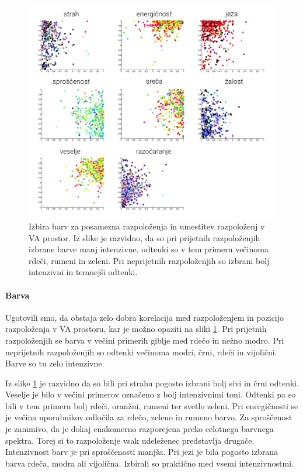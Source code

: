 \documentclass[a4paper, 12pt]{book}
\begin{document}
{\begin{figure}[!hbt]
\centering
\includegraphics[width=14cm]{images/mood_color.png}

\caption{Izbira barv za posamezna razpoloženja in umestitev razpoloženj v VA prostor. Iz slike je razvidno, da so pri prijetnih razpoloženjih izbrane barve manj intenzivne, odtenki so v tem primeru večinoma rdeči, rumeni in zeleni. Pri neprijetnih razpoloženjih so izbrani bolj intenzivni in temnejši odtenki.}
\label{moodcolor}
\end{figure} 

\paragraph{Barva}

Ugotovili smo, da obstaja zelo dobra korelacija med razpoloženjem in  pozicijo razpoloženja v VA prostoru, kar je možno opaziti na sliki \ref{moodcolor}. Pri prijetnih razpoloženjih se barva v večini primerih giblje med rdečo in nežno modro. Pri neprijetnih razpoloženjih so odtenki večinoma modri, črni, rdeči in vijolični. Barve so tu zelo intenzivne.

Iz slike \ref{moodcolor} je razvidno da so bili pri strahu pogosto izbrani bolj sivi in črni odtenki. Veselje je bilo v večini primerov označeno z bolj intenzivnimi toni. Odtenki pa so bili v tem primeru bolj rdeči, oranžni, rumeni ter svetlo zeleni. Pri energičnosti se je večina uporabnikov odločila za rdečo, zeleno in rumeno barvo. Za sproščenost je zanimivo, da je dokaj enakomerno razporejena preko celotnega barvnega spektra. Torej si to razpoloženje vsak udeleženec predstavlja drugače. Intenzivnost barv je pri sproščenosti manjša. Pri jezi je bila pogosto izbrana barva rdeča, modra ali vijolična. Izbirali so praktično med vsemi intenzivnostmi.


}
\end{document}
